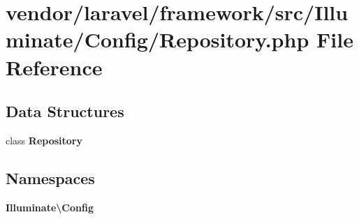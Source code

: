 \section{vendor/laravel/framework/src/\+Illuminate/\+Config/\+Repository.php File Reference}
\label{_config_2_repository_8php}
\subsection*{Data Structures}
\begin{DoxyCompactItemize}
\item 
class {\bf Repository}
\end{DoxyCompactItemize}
\subsection*{Namespaces}
\begin{DoxyCompactItemize}
\item 
 {\bf Illuminate\textbackslash{}\+Config}
\end{DoxyCompactItemize}
